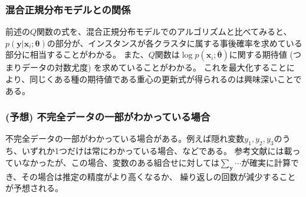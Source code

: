 \documentclass[9pt,draft,twocolumn]{jsarticle}
\newcommand{\bmx}{{\bm{x}}}
\newcommand{\bmy}{{\bm{y}}}
\newcommand{\bmt}{{\bm\theta}}
\newcommand{\bmtb}{\bar\bmt}
\newcommand{\dsum}{\displaystyle\sum}
\begin{document}
\subsubsection{混合正規分布モデルとの関係}
前述の$Q$関数の式を、混合正規分布モデルでのアルゴリズムと比べてみると、$p(\bmy | \bmx_i
;\bmt)$の部分が、インスタンスが各クラスタに属する事後確率を求めている部分に相当することがわかる。
また、$Q$関数は$\log p(\bmx_i;\bmtb)$に関する期待値 (つまりデータの対数尤度) を求めていることがわかる。
これを最大化することにより、同じくある種の期待値である重心の更新式が得られるのは興味深いことである。

\subsubsection{(予想) 不完全データの一部がわかっている場合}
不完全データの一部がわかっている場合がある。例えば隠れ変数$y_1,y_2,y_3$のうち、いずれか1つだけは常にわかっている場合、などである。
参考文献には載っていなかったが、この場合、変数のある組合せに対しては$\dsum_\bmy\cdots$が確実に計算でき、その場合は推定の精度がより高くなるか、
繰り返しの回数が減少することが予想される。



\end{document}
